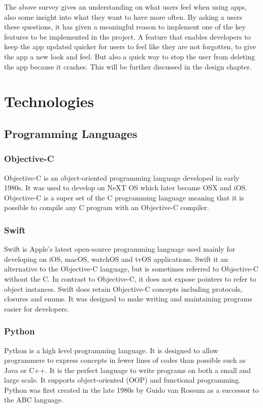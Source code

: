 The above survey gives an understanding on what users feel when using apps, also some insight into what they want to have more often. By asking a users these questions, it has given a meaningful reason to implement one of the key features to be implemented in the project. A feature that enables developers to keep the app updated quicker for users to feel like they are not forgotten, to give the app a new look and feel. But also a quick way to stop the user from deleting the app because it crashes. This will be further discussed in the design chapter.



\section{Technologies}

\subsection{Programming Languages}

\subsubsection{Objective-C}
Objective-C \cite{objectiveC} is an object-oriented programming language developed in early 1980s.  It was used to develop on NeXT OS which later became OSX and iOS.  Objective-C is a super set of the  C programming language meaning that it is possible to compile any C program with an Objective-C compiler. 

\subsubsection{Swift}
Swift \cite{swift} is Apple’s latest open-source programming language used mainly for developing on iOS, macOS, watchOS and tvOS applications.  Swift it an alternative to the Objective-C language, but is sometimes referred to Objective-C without the C. In contrast to Objective-C, it does not expose pointers to refer to object instances. Swift does retain Objective-C concepts including protocols, closures and enums. It was designed to make writing and maintaining programs easier for developers.

\subsubsection{Python}
Python \cite{python} is a high level programming language. It is designed to allow programmers to express concepts in fewer lines of codes than possible such as Java or C++. It is the perfect language to write programs on both a small and large scale. It supports object-oriented (OOP) and functional programming. Python was first created in the late 1980s by Guido van Rossum as a successor to the ABC language.

